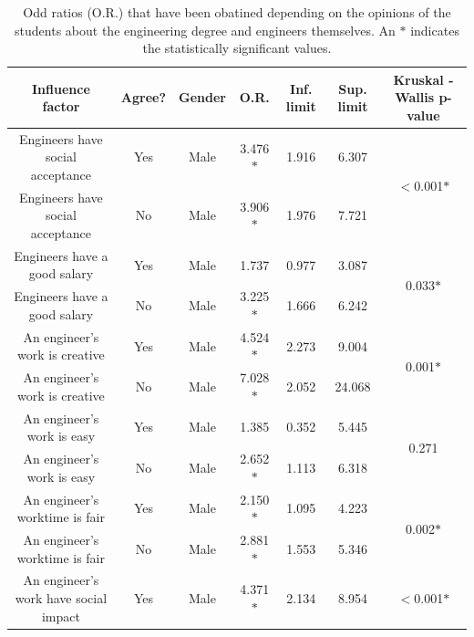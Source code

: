 \documentclass[journal,transmag]{IEEEtran}
\begin{document}
\begin{table}
	\caption[Odd ratios for every influence factor.]{Odd ratios (O.R.) that have been obatined depending on the opinions of the students about the engineering degree and engineers themselves. An \textbf{$*$} indicates the statistically significant values.}
	\label{tab:oddratiosop}
	
	\begin{center}
		\begin{tabular}{|c|c|c|c|c|c|c|}
		\hline
		Influence factor                        & Agree? & Gender & O.R.     & Inf. limit & Sup. limit & Kruskal - Wallis p-value     \\ \hline
		Engineers have social acceptance        & Yes    & Male   & 3.476$*$ & 1.916      & 6.307      & \multirow{2}{*}{$<$0.001$*$} \\ \cline{1-6}
		Engineers have social acceptance        & No     & Male   & 3.906$*$ & 1.976      & 7.721      &                              \\ \hline
		Engineers have a good salary            & Yes    & Male   & 1.737    & 0.977      & 3.087      & \multirow{2}{*}{0.033$*$}    \\ \cline{1-6}
		Engineers have a good salary            & No     & Male   & 3.225$*$ & 1.666      & 6.242      &                              \\ \hline
		An engineer’s work is creative          & Yes    & Male   & 4.524$*$ & 2.273      & 9.004      & \multirow{2}{*}{0.001$*$}    \\ \cline{1-6}
		An engineer’s work is creative          & No     & Male   & 7.028$*$ & 2.052      & 24.068     &                              \\ \hline
		An engineer’s work is easy              & Yes    & Male   & 1.385    & 0.352      & 5.445      & \multirow{2}{*}{0.271}       \\ \cline{1-6}
		An engineer’s work is easy              & No     & Male   & 2.652$*$ & 1.113      & 6.318      &                              \\ \hline
		An engineer’s worktime is fair          & Yes    & Male   & 2.150$*$ & 1.095      & 4.223      & \multirow{2}{*}{0.002$*$}    \\ \cline{1-6}
		An engineer’s worktime is fair          & No     & Male   & 2.881$*$ & 1.553      & 5.346      &                              \\ \hline
		An engineer’s work have social impact   & Yes    & Male   & 4.371$*$ & 2.134      & 8.954      & \multirow{2}{*}{$<$0.001$*$} \\ \cline{1-6}

\end{tabular}
\end{center}
\end{table}
\end{document}
